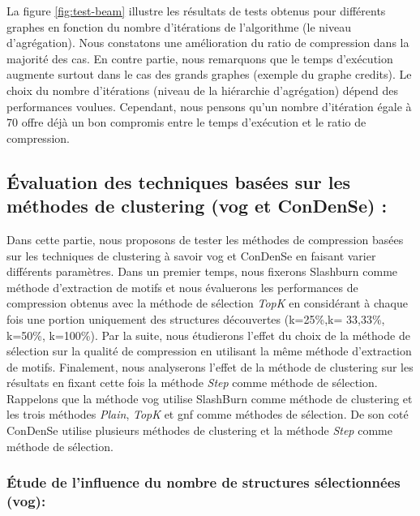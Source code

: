 	
	  La figure \ref{fig:test-beam} illustre les résultats de tests obtenus pour différents graphes en fonction du nombre d'itérations de l'algorithme (le niveau d'agrégation). Nous constatons une amélioration du ratio de compression dans la majorité des cas. En contre partie, nous remarquons que le temps d'exécution  augmente surtout dans le cas des grands graphes (exemple du graphe credits). Le choix du nombre d'itérations (niveau de la hiérarchie d'agrégation) dépend des performances voulues. Cependant, nous pensons qu'un  nombre d'itération égale à 70 offre déjà un bon compromis entre le temps d'exécution et le ratio de compression.
	
	\subsection{Évaluation des techniques basées sur les méthodes de clustering (\gls{vog} et \gls{ConDenSe}) :}
	
	Dans cette partie, nous proposons de tester les méthodes de compression basées sur les techniques de clustering à savoir \gls{vog} et \gls{ConDenSe} en faisant varier différents paramètres. Dans un premier temps, nous fixerons  Slashburn comme méthode d'extraction de motifs et nous évaluerons les performances de compression obtenus avec la méthode de sélection \textit{TopK} en considérant à chaque fois une portion uniquement des structures découvertes (k=25\%,k= 33,33\%, k=50\%, k=100\%). Par la suite, nous étudierons l'effet  du choix de la méthode de sélection sur la qualité de compression en  utilisant la même méthode d'extraction de motifs. Finalement, nous analyserons l'effet de la méthode de clustering sur les résultats en fixant cette fois la méthode \textit{Step} comme méthode de sélection. Rappelons que la méthode \gls{vog} utilise SlashBurn comme méthode de clustering et les trois méthodes \textit{Plain}, \textit{TopK} et \gls{gnf} comme méthodes de sélection. De son coté \gls{ConDenSe} utilise plusieurs méthodes de clustering et la méthode \textit{Step} comme méthode de sélection.
	
	
		
		\subsubsection{Étude de l'influence du nombre de structures sélectionnées (\gls{vog}):}
	
